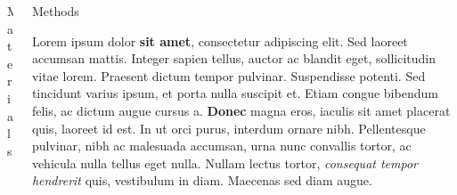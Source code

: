 \documentclass[final]{beamer}
\newlength{\onecolwid}
\newlength{\twocolwid}
\begin{document}
\begin{frame}[t]
\begin{columns}[t]
\begin{column}{\twocolwid}
\begin{columns}[t,totalwidth=\twocolwid]
\begin{column}{\onecolwid}
\begin{block}{Materials}
                    \end{block}


                \end{column} %

                \begin{column}{\onecolwid}\vspace{-.6in} %


                    \begin{block}{Methods}

                        Lorem ipsum dolor \textbf{sit amet}, consectetur adipiscing elit. Sed laoreet accumsan mattis. Integer sapien tellus, auctor ac blandit eget, sollicitudin vitae lorem. Praesent dictum tempor pulvinar. Suspendisse potenti. Sed tincidunt varius ipsum, et porta nulla suscipit et. Etiam congue bibendum felis, ac dictum augue cursus a. \textbf{Donec} magna eros, iaculis sit amet placerat quis, laoreet id est. In ut orci purus, interdum ornare nibh. Pellentesque pulvinar, nibh ac malesuada accumsan, urna nunc convallis tortor, ac vehicula nulla tellus eget nulla. Nullam lectus tortor, \textit{consequat tempor hendrerit} quis, vestibulum in diam. Maecenas sed diam augue.

                    \end{block}


                \end{column} %

            \end{columns} %



\end{column}
\end{columns}
\end{frame}
\end{document}
